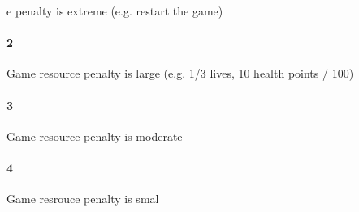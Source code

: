 e penalty is extreme (e.g. restart the game)\paragraph{2}Game resource penalty is large (e.g. 1/3 lives, 10 health points / 100)\paragraph{3}Game resource penalty is moderate\paragraph{4}Game resrouce penalty is smal
